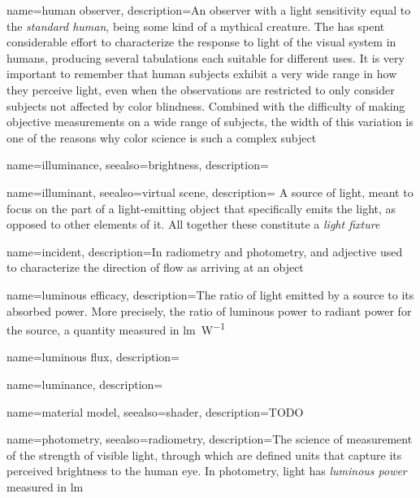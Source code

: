 {    
	name={human observer},
	description={An observer with a light sensitivity equal to the \textsl{standard human},
		being some kind of a mythical creature.
		The  has spent considerable effort to characterize the response to light 
		of the visual system in humans, producing several tabulations each suitable for
		different uses. 
		It is very important to remember that human subjects exhibit a very wide range 
		in how they perceive light, even when the observations are restricted to only 
		consider subjects not affected by color blindness.
		Combined with the difficulty of making objective measurements on a wide range 
		of subjects, the width of this variation is one of the reasons why color science is
		such a complex subject}
}

{
	name=illuminance,
	seealso={brightness},
	description=\nopostdesc
}

{
	name=illuminant,
	seealso={virtual scene},
	description={
		A source of light, meant to focus on the part of a light-emitting object that
	    specifically emits the light, as opposed to other elements of it. All together
        these constitute a \textsl{light fixture}}
}

{
	name={incident},
	description={In radiometry and photometry, and adjective used to characterize the direction of
		flow as arriving at an object}
}

{
	name={luminous efficacy},
	description={The ratio of light emitted by a source to its absorbed power.
		More precisely, the ratio of luminous power to radiant power for the source,
		a quantity measured in \unit{\lumen\per\watt}}
}

{
	name={luminous flux},
	description=\nopostdesc
}

{
	name={luminance},
	description=\nopostdesc
}

{
	name={material model},
	seealso={shader},
	description={TODO}
}

{
	name={photometry},
	seealso={radiometry},
	description={The science of measurement of the strength of visible light, 
		through which are defined units that capture its perceived brightness 
		to the human eye. In photometry, light has \textsl{luminous power} 
		measured in \unit{\lumen}}
}


